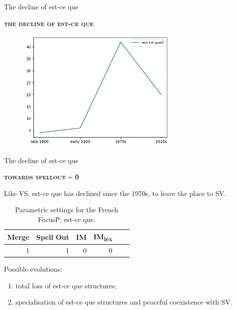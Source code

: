 \documentclass[lesson_slides]{subfiles}
\begin{document}
\begin{frame}[c]{The decline of est-ce que}

    \textbf{\textsc{the decline of est-ce que}} \pause

    \begin{center}
        \includegraphics[width=10cm, height=6cm]{images/estceque.png}
    \end{center}
  
\end{frame}
\begin{frame}[c]{The decline of est-ce que}

    \textbf{\textsc{towards spellout$=$0}} \pause

Like VS, est-ce que has declined since the 1970s, to leave the place to SV. \pause

\begin{table}[H]
    \centering
    \begin{tabular}{|r|r|r|r|r|r|}
    \hline
    Merge & Spell Out & IM & IM\textsubscript{lex} \\
    \hline
    1 & 1 & 0 & 0 \\
    \hline
    \end{tabular}
    \caption{\label{tab:samp}Parametric settings for the French FocusP: est-ce que.}
\end{table} \pause

\noindent Possible evolutions: \pause

\begin{enumerate}
    \item total loss of est-ce que structures; \pause
    \item specialisation of est-ce que structures and peaceful coexistence with SV.
\end{enumerate}
  
\end{frame}
\end{document}
